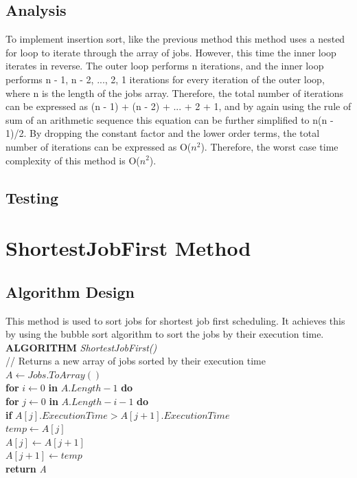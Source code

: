 \documentclass[12pt,a4paper]{article}
\begin{document}
		\subsection{Analysis}
			To implement insertion sort, like the previous method this method uses a nested for loop to 
			iterate through the array of jobs. However, this time the inner loop iterates in reverse. 
			The outer loop performs n iterations, and the inner loop performs n - 1, n - 2, ..., 2, 1 
			iterations for every iteration of the outer loop, where n is the length of the jobs array. Therefore, 
			the total number of iterations can be expressed as (n - 1) + (n - 2) + ... + 2 + 1, and by again 
			using the rule of sum of an arithmetic sequence this equation can be further simplified to n(n - 1)/2. 
			By dropping the constant factor and the lower order terms, the total number of iterations can be 
			expressed as O($n ^ 2$). Therefore, the worst case time complexity of this method is O($n ^ 2$).\\

		\subsection{Testing}
	\section{ShortestJobFirst Method}
		\subsection{Algorithm Design}
			This method is used to sort jobs for shortest job first scheduling. It achieves this by 
			using the bubble sort algorithm to sort the jobs by their execution time.\\
			
			\textbf{ALGORITHM} \textit{ShortestJobFirst()}\\
			\null\hspace{1cm}// Returns a new array of jobs sorted by their execution time\\
			\null\hspace{1cm}\textit{$A \gets Jobs.ToArray()$}\\
			\null\hspace{1cm}\textbf{for} \textit{$i \gets 0$} \textbf{in} \textit{$A.Length - 1$} \textbf{do}\\
			\null\hspace{2cm}\textbf{for} \textit{$j \gets 0$} \textbf{in} \textit{$A.Length - i - 1$} \textbf{do}\\
			\null\hspace{3cm}\textbf{if} \textit{$A[j].ExecutionTime > A[j + 1].ExecutionTime$}\\
			\null\hspace{4cm}\textit{$temp \gets A[j]$}\\
			\null\hspace{4cm}\textit{$A[j] \gets A[j + 1]$}\\
			\null\hspace{4cm}\textit{$A[j + 1] \gets temp$}\\
			\null\hspace{1cm}\textbf{return} \textit{A}\\
\end{document}
